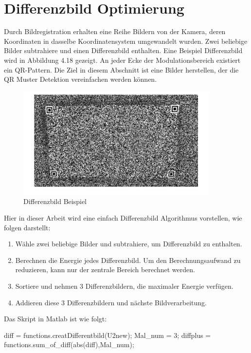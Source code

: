 \section{Differenzbild Optimierung}
Durch Bildregistration erhalten eine Reihe Bildern von der Kamera, deren Koordinaten in dasselbe Koordinatensystem umgewandelt wurden.
Zwei beliebige Bilder subtrahiere und einen Differenzbild enthalten. Eine Beispiel Differenzbild wird in Abbildung 4.18 gezeigt. An jeder Ecke der Modulationsbereich existiert ein QR-Pattern. Die Ziel in diesem Abschnitt ist eine Bilder herstellen, der die QR Muster Detektion vereinfachen werden können.

\begin{figure}[H]
 \centering 
 \includegraphics[keepaspectratio,width=0.9\textwidth]{images/4_ZweiteErfahrung/Kamera/differenzbild.pdf}
 \caption{Differenzbild Beispiel}
 \label{fig:Differenzbild}
\end{figure} 

Hier in dieser Arbeit wird eine einfach Differenzbild Algorithmus vorstellen, wie folgen darstellt:

\begin{enumerate}
	\item Wähle zwei beliebige Bilder und subtrahiere, um Differenzbild zu enthalten.
	\item Berechnen die Energie jedes Differenzbild. Um den Berechnungsaufwand zu reduzieren, kann nur der zentrale Bereich berechnet werden.
	\item Sortiere und nehmen 3 Differenzbildern, die maximaler Energie verfügen.
	\item Addieren diese 3 Differenzbildern und nächste Bildverarbeitung.
\end{enumerate}

Das Skript in Matlab ist wie folgt:
\singlespacing
\begin{matlab}[firstnumber=1, name=MATLABCodeBeispiel, caption={MATLAB Code Binarisierung}, label={lst:MATLABCodeBinarisierung}]

diff = functions.creatDifferentbild(U2new);
Mal_num = 3;
diffplus = functions.sum_of_diff(abs(diff),Mal_num);

\end{matlab}
\onehalfspacing

